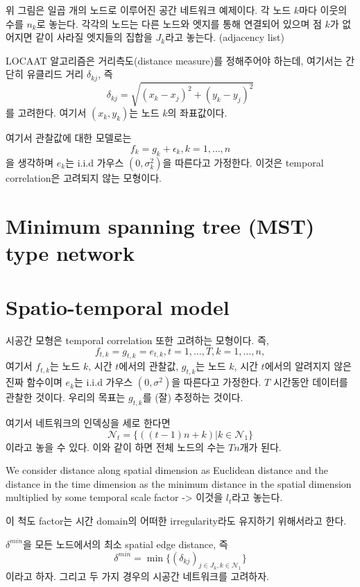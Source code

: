 \documentclass[b5paper,]{scrbook}
\theoremstyle{plain}
\theoremstyle{definition}
\numberwithin{equation}{section}
\begin{document}
위 그림은 일곱 개의 노드로 이루어진 공간 네트워크 예제이다. 각 노드 \(k\)마다 이웃의 수를 \(n_{k}\)로 놓는다. 각각의 노드는 다른 노드와 엣지를 통해 연결되어 있으며 점 \(k\)가 없어지면 같이 사라질 엣지들의 집합을 \(J_{k}\)라고 놓는다. (adjacency list)

LOCAAT 알고리즘은 거리측도(distance measure)를 정해주어야 하는데, 여기서는 간단히 유클리드 거리 \(\delta_{kj}\), 즉
\[\delta_{kj}=\sqrt{(x_{k}-x_{j})^{2}+(y_{k}-y_{j})^{2}}\]
를 고려한다. 여기서 \((x_{k},y_{k})\)는 노드 \(k\)의 좌표값이다.

여기서 관찰값에 대한 모델로는
\[f_{k}=g_{k}+\epsilon_{k}, k=1,\ldots , n\]
을 생각하며 \(e_{k}\)는 i.i.d 가우스 \((0,\sigma_{k}^{2})\)을 따른다고 가정한다. 이것은 temporal correlation은 고려되지 않는 모형이다.

\hypertarget{minimum-spanning-tree-mst-type-network}{%
\section{Minimum spanning tree (MST) type network}\label{minimum-spanning-tree-mst-type-network}}

\hypertarget{spatio-temporal-model}{%
\section{Spatio-temporal model}\label{spatio-temporal-model}}

시공간 모형은 temporal correlation 또한 고려하는 모형이다. 즉,
\[f_{t,k}=g_{t,k}=e_{t,k}, t=1,\ldots, T, k=1,\ldots , n,\]
여기서 \(f_{t,k}\)는 노드 \(k\), 시간 \(t\)에서의 관찰값, \(g_{t,k}\)는 노드 \(k\), 시간 \(t\)에서의 알려지지 않은 진짜 함수이며 \(e_{k}\)는 i.i.d 가우스 \((0,\sigma^{2})\)을 따른다고 가정한다. \(T\) 시간동안 데이터를 관찰한 것이다. 우리의 목표는 \(g_{t,k}\)를 (잘) 추정하는 것이다.

여기서 네트워크의 인덱싱을 세로 한다면
\[\mathcal{N}_{t}=\{((t-1)n+k)| k \in \mathcal{N}_{1}\}\]
이라고 놓을 수 있다. 이와 같이 하면 전체 노드의 수는 \(Tn\)개가 된다.

We consider distance along spatial dimension as Euclidean distance and the distance in the time dimension as the minimum distance in the spatial dimension multiplied by some temporal scale factor -\textgreater{} 이것을 \(l_{t}\)라고 놓는다.

이 척도 factor는 시간 domain의 어떠한 irregularity라도 유지하기 위해서라고 한다.

\(\delta^{min}\)을 모든 노드에서의 최소 spatial edge distance, 즉
\[\delta^{min}=\min \{ (\delta_{kj})_{j\in J_{k}, k\in \mathcal{N}_{1}}\}\]
이라고 하자. 그리고 두 가지 경우의 시공간 네트워크를 고려하자.
\end{document}
